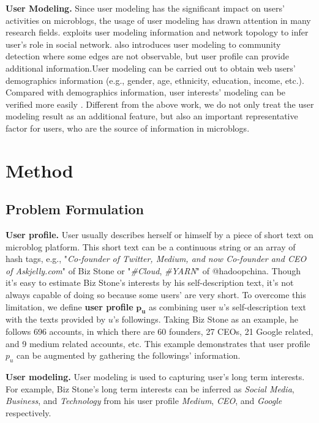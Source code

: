 \documentclass[runningheads,a4paper]{llncs}
\begin{document}
\textbf{User Modeling.} Since user modeling has the significant impact on users' activities on microblogs, the usage of user modeling has drawn attention in many research fields. 
\cite{zhao2013inferring} exploits user modeling information and network topology to infer user's role in social network.
\cite{yoshida2013toward} also introduces user modeling to community detection where some edges are not observable, but user profile can provide additional information.User modeling can be carried out to obtain web users' demographics information \cite{culotta2015predicting} (e.g., gender, age, ethnicity, education, income, etc.).
Compared with demographics information, user interests' modeling can be verified more easily \cite{faralli2015large}. 
Different from the above work, we do not only treat the user modeling result as an additional feature, but also an important representative factor for users, who are the source of information in microblogs.


\section{Method}
\subsection{Problem Formulation}
\textbf{User profile.} User usually describes herself or himself by a piece of short text on microblog platform.
This short text can be a continuous string or an array of hash tags, e.g., "\textit{Co-founder of Twitter, Medium, and now Co-founder and CEO of Askjelly.com}" of Biz Stone or "\textit{\#Cloud}, \textit{\#YARN}" of @hadoopchina.
Though it's easy to estimate Biz Stone's interests by his self-description text, it's not always capable of doing so because some users' are very short.
To overcome this limitation, we define \textbf{user profile} \(\bm{p_u}\) as combining user \(u\)'s self-description text with the texts provided by \(u\)'s followings. 
Taking Biz Stone as an example, he follows 696 accounts, in which there are 60 founders, 27 CEOs, 21 Google related, and 9 medium related accounts, etc. 
This example demonstrates that user profile \(p_u\) can be augmented by gathering the followings' information.

\textbf{User modeling.} 
User modeling is used to capturing user's long term interests. 
For example, Biz Stone's long term interests can be inferred as \textit{Social Media}, \textit{Business}, and \textit{Technology} from his user profile \textit{Medium}, \textit{CEO}, and \textit{Google} respectively.
\end{document}
